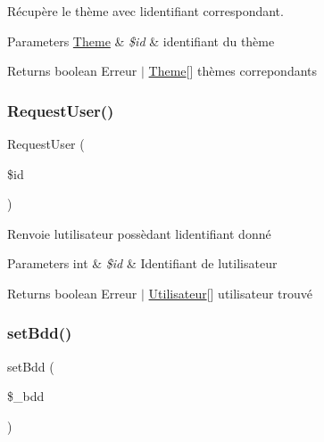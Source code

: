 Récupère le thème avec l\textquotesingle{}identifiant correspondant. 


\begin{DoxyParams}[1]{Parameters}
\mbox{\hyperlink{class_theme}{Theme}} & {\em \$id} & identifiant du thème\\
\hline
\end{DoxyParams}
\begin{DoxyReturn}{Returns}
boolean Erreur $\vert$ \mbox{\hyperlink{class_theme}{Theme}}\mbox{[}\mbox{]} thèmes correpondants 
\end{DoxyReturn}
\mbox{\label{class_interface_b_d_d_a3069460bb26daac4b0777cb763ab198a}} 
\subsubsection{\texorpdfstring{Request\+User()}{RequestUser()}}
{\footnotesize\ttfamily Request\+User (\begin{DoxyParamCaption}\item[{}]{\$id }\end{DoxyParamCaption})}



Renvoie l\textquotesingle{}utilisateur possèdant l\textquotesingle{}identifiant donné 


\begin{DoxyParams}[1]{Parameters}
int & {\em \$id} & Identifiant de l\textquotesingle{}utilisateur\\
\hline
\end{DoxyParams}
\begin{DoxyReturn}{Returns}
boolean Erreur $\vert$ \mbox{\hyperlink{class_utilisateur}{Utilisateur}}\mbox{[}\mbox{]} utilisateur trouvé 
\end{DoxyReturn}
\mbox{\label{class_interface_b_d_d_a91f08708d6515a9a029053f06c057ea4}} 
\subsubsection{\texorpdfstring{set\+Bdd()}{setBdd()}}
{\footnotesize\ttfamily set\+Bdd (\begin{DoxyParamCaption}\item[{}]{\$\+\_\+bdd }\end{DoxyParamCaption})}



